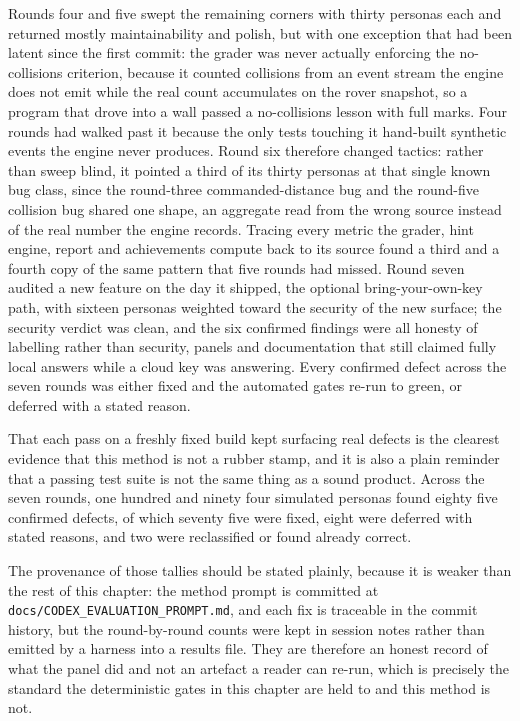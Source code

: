 \documentclass[11pt,a4paper]{report}
\begin{document}
Rounds four and five swept the remaining corners with thirty personas each and returned mostly maintainability and polish, but with one exception that had been latent since the first commit: the grader was never actually enforcing the no-collisions criterion, because it counted collisions from an event stream the engine does not emit while the real count accumulates on the rover snapshot, so a program that drove into a wall passed a no-collisions lesson with full marks. Four rounds had walked past it because the only tests touching it hand-built synthetic events the engine never produces. Round six therefore changed tactics: rather than sweep blind, it pointed a third of its thirty personas at that single known bug class, since the round-three commanded-distance bug and the round-five collision bug shared one shape, an aggregate read from the wrong source instead of the real number the engine records. Tracing every metric the grader, hint engine, report and achievements compute back to its source found a third and a fourth copy of the same pattern that five rounds had missed. Round seven audited a new feature on the day it shipped, the optional bring-your-own-key path, with sixteen personas weighted toward the security of the new surface; the security verdict was clean, and the six confirmed findings were all honesty of labelling rather than security, panels and documentation that still claimed fully local answers while a cloud key was answering. Every confirmed defect across the seven rounds was either fixed and the automated gates re-run to green, or deferred with a stated reason.

That each pass on a freshly fixed build kept surfacing real defects is the clearest evidence that this method is not a rubber stamp, and it is also a plain reminder that a passing test suite is not the same thing as a sound product. Across the seven rounds, one hundred and ninety four simulated personas found eighty five confirmed defects, of which seventy five were fixed, eight were deferred with stated reasons, and two were reclassified or found already correct.

The provenance of those tallies should be stated plainly, because it is weaker than the rest of this chapter: the method prompt is committed at \texttt{docs/CODEX\_EVALUATION\_PROMPT.md}, and each fix is traceable in the commit history, but the round-by-round counts were kept in session notes rather than emitted by a harness into a results file. They are therefore an honest record of what the panel did and not an artefact a reader can re-run, which is precisely the standard the deterministic gates in this chapter are held to and this method is not.
\end{document}
